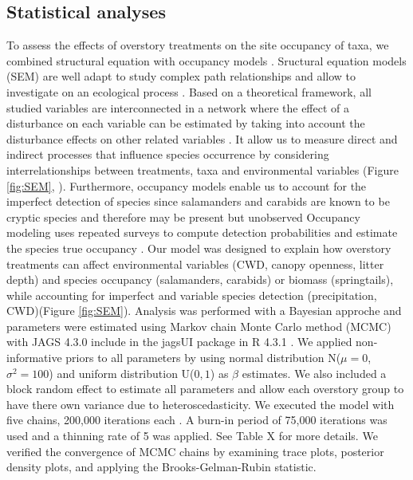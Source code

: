 \subsection*{Statistical analyses}
\label{subsec:analyses}

To assess the effects of overstory treatments on the site occupancy of taxa, we combined structural equation with occupancy models \citep{graceSpecificationStructuralEquation2010,josephIntegratingOccupancyModels2016,mackenzieOccupancyEstimationModeling2006a}.
Sructural equation models (SEM) are well adapt to study complex path relationships and allow to investigate on an ecological process \citep{graceStructuralEquationModeling2008}.
Based on a theoretical framework, all studied variables are interconnected in a network where the effect of a disturbance on each variable can be estimated by taking into account 
the disturbance effects on other related variables \citep{graceStructuralEquationModeling2008}.
It allow us to measure direct and indirect processes that influence species occurrence by considering interrelationships between treatments, taxa and environmental variables (Figure \ref*{fig:SEM}, \citealp{graceSpecificationStructuralEquation2010}).
Furthermore, occupancy models enable us to account for the imperfect detection of species since salamanders and carabids are known to be cryptic species and therefore may be present but unobserved \citep{baileyEstimatingSiteOccupancy2004,spiersEstimatingSpeciesMisclassification2022}
Occupancy modeling uses repeated surveys to compute detection probabilities and estimate the species true occupancy \citep{mackenzieEstimatingSiteOccupancy2002,mazerolleMakingGreatLeaps2007}.
Our model was designed to explain how overstory treatments can affect environmental variables (CWD, canopy openness, litter depth) 
and species occupancy (salamanders, carabids) or biomass (springtails), while accounting for imperfect and variable species detection (precipitation, CWD)(Figure \ref*{fig:SEM}).
Analysis was performed with a Bayesian approche and parameters were estimated using Markov chain Monte Carlo method (MCMC) with JAGS 4.3.0 include in the jagsUI package in R 4.3.1 \citep{lunnBUGSProjectEvolution2009,kellnerJagsUIWrapperRjags2024,rcoreteamLanguageEnvironmentStatistical2020}.
We applied non-informative priors to all parameters by using normal distribution N($\mu = 0$, $\sigma^2 = 100$) and uniform distribution U($0,1$) as $\beta$ estimates. 
We also included a block random effect to estimate all parameters and allow each overstory group to have there own variance due to heteroscedasticity. 
We executed the model with five chains, 200,000 iterations each \citep{gelmanUnderstandingPredictiveInformation2014}. A burn-in period of 75,000 iterations was used and a thinning rate of 5 was applied. See Table X for more details.
We verified the convergence of MCMC chains by examining trace plots, posterior density plots, and applying the Brooks-Gelman-Rubin statistic.


